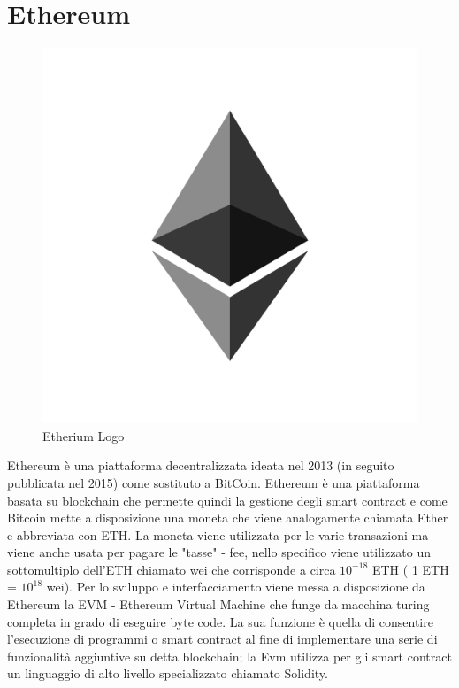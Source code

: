 \documentclass[12pt,titlepage]{report}
\begin{document}
\section{Ethereum}

\begin{figure}[h]
	\includegraphics[height=0.2\textheight]{eth}
	\centering
	\caption{Etherium Logo}
	\label{fig:eth-logo}
\end{figure}

Ethereum è una piattaforma decentralizzata ideata nel 2013 (in seguito pubblicata nel 2015) come sostituto a BitCoin. Ethereum è una piattaforma basata su blockchain che permette quindi la gestione degli smart contract e come Bitcoin mette a disposizione una moneta che viene analogamente chiamata Ether e abbreviata con ETH. La moneta viene utilizzata per le varie transazioni ma viene anche usata per pagare le "tasse" - fee, nello specifico viene utilizzato un sottomultiplo dell'ETH chiamato wei che corrisponde a circa  $ 10^{-18} $ ETH  ( 1 ETH = $ 10^{18} $ wei). Per lo sviluppo e interfacciamento viene messa a disposizione da Ethereum la EVM - Ethereum Virtual Machine che funge da macchina turing completa in grado di eseguire byte code. La sua funzione è quella di consentire l'esecuzione di programmi o smart contract al fine di implementare una serie di funzionalità aggiuntive su detta blockchain; la Evm utilizza per gli smart contract un linguaggio di alto livello specializzato chiamato Solidity.
\end{document}
